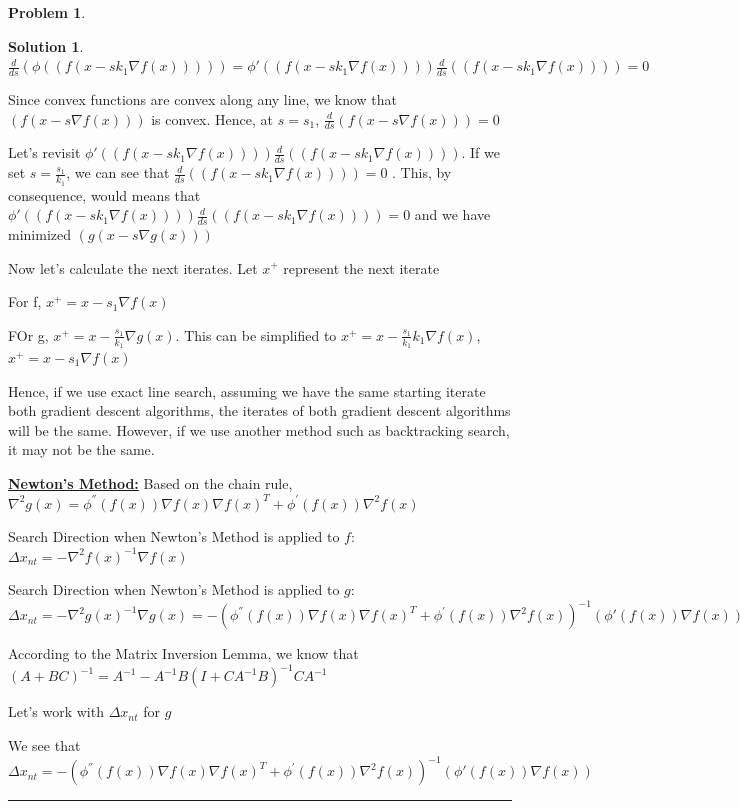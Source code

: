 \documentclass{article}
\theoremstyle{definition}
\newtheorem{problem}{Problem}
\def\fline{\rule{0.75\linewidth}{0.5pt}}
\newcommand{\finishline}{\begin{center}\fline\end{center}}
\newtheorem*{solution*}{Solution}
\newenvironment{solution}{\begin{solution*}}{{\finishline} \end{solution*}}
\begin{document}
\begin{problem}
\begin{solution}
    $\frac{d}{ds} (\phi((f(x - sk_1 \nabla f(x))))) = \phi'((f(x - sk_1 \nabla f(x)))) \frac{d}{ds} ((f(x - sk_1 \nabla f(x)))) = 0$

    Since convex functions are convex along any line, we know that $(f(x - s\nabla f(x)))$ is convex. Hence, at $s = s_1$, $\frac{d}{ds}(f(x - s\nabla f(x))) = 0$ \newline 

    Let's revisit $\phi'((f(x - sk_1 \nabla f(x)))) \frac{d}{ds} ((f(x - sk_1 \nabla f(x))))$. If we set $s = \frac{s_1}{k_1}$, we can see that $\frac{d}{ds} ((f(x - sk_1 \nabla f(x)))) = 0$ . This, by consequence, would means that $\phi'((f(x - sk_1 \nabla f(x)))) \frac{d}{ds} ((f(x - sk_1 \nabla f(x)))) = 0$ and we have minimized $(g(x - s\nabla g(x)))$

    Now let's calculate the next iterates. \newline 
    Let $x^+$ represent the next iterate

    For f, $x^+ = x - s_1 \nabla f(x)$

    FOr g, $x^+ = x - \frac{s_1}{k_1} \nabla g(x)$. This can be simplified to $x^+ = x - \frac{s_1}{k_1} k_1 \nabla f(x)$, $x^+ = x - s_1 \nabla f(x)$

    Hence, if we use exact line search, assuming we have the same starting iterate both gradient descent algorithms, the iterates of both gradient descent algorithms will be the same. However, if we use another method such as backtracking search, it may not be the same. 

\textbf{\underline{Newton's Method:}} \newline 
Based on the chain rule, $\nabla^2g(x) = \phi^{''}(f(x)) \nabla f(x) \nabla f(x)^T + \phi^{'}(f(x))\nabla^2f(x)$

Search Direction when Newton's Method is applied to $f$: $\Delta x_{nt} = -\nabla^2f(x)^{-1} \nabla f(x)$

Search Direction when Newton's Method is applied to $g$: $\Delta x_{nt} = -\nabla^2g(x)^{-1} \nabla g(x) = -(\phi^{''}(f(x)) \nabla f(x) \nabla f(x)^T + \phi^{'}(f(x))\nabla^2f(x))^{-1} ( \phi'(f(x)) \nabla f(x))$


According to the Matrix Inversion Lemma, we know that $(A + BC)^{-1} = A^{-1} - A^{-1}B (I + CA^{-1}B)^{-1} CA^{-1}$ \newline 

Let's work with $\Delta x_{nt}$ for $g$ 

We see that $\Delta x_{nt} = -(\phi^{''}(f(x)) \nabla f(x) \nabla f(x)^T + \phi^{'}(f(x))\nabla^2f(x))^{-1} ( \phi'(f(x)) \nabla f(x))$ \newline 


\end{solution}
\end{problem}
\end{document}
